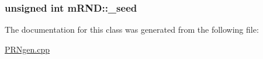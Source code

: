 \subsubsection[{\texorpdfstring{\+\_\+seed}{_seed}}]{\setlength{\rightskip}{0pt plus 5cm}unsigned int m\+R\+N\+D\+::\+\_\+seed\hspace{0.3cm}{\ttfamily [protected]}}\hypertarget{classmRND_a7c8375524993fb98192122643deac7d7}{}\label{classmRND_a7c8375524993fb98192122643deac7d7}


The documentation for this class was generated from the following file\+:\begin{DoxyCompactItemize}
\item 
\hyperlink{PRNgen_8cpp}{P\+R\+Ngen.\+cpp}\end{DoxyCompactItemize}

